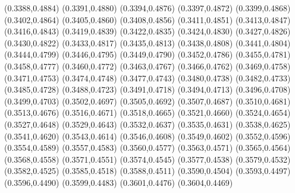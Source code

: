 \PST@Filltriangle(0.3388,0.4884)
\PST@Filltriangle(0.3391,0.4880)
\PST@Filltriangle(0.3394,0.4876)
\PST@Filltriangle(0.3397,0.4872)
\PST@Filltriangle(0.3399,0.4868)
\PST@Filltriangle(0.3402,0.4864)
\PST@Filltriangle(0.3405,0.4860)
\PST@Filltriangle(0.3408,0.4856)
\PST@Filltriangle(0.3411,0.4851)
\PST@Filltriangle(0.3413,0.4847)
\PST@Filltriangle(0.3416,0.4843)
\PST@Filltriangle(0.3419,0.4839)
\PST@Filltriangle(0.3422,0.4835)
\PST@Filltriangle(0.3424,0.4830)
\PST@Filltriangle(0.3427,0.4826)
\PST@Filltriangle(0.3430,0.4822)
\PST@Filltriangle(0.3433,0.4817)
\PST@Filltriangle(0.3435,0.4813)
\PST@Filltriangle(0.3438,0.4808)
\PST@Filltriangle(0.3441,0.4804)
\PST@Filltriangle(0.3444,0.4799)
\PST@Filltriangle(0.3446,0.4795)
\PST@Filltriangle(0.3449,0.4790)
\PST@Filltriangle(0.3452,0.4786)
\PST@Filltriangle(0.3455,0.4781)
\PST@Filltriangle(0.3458,0.4777)
\PST@Filltriangle(0.3460,0.4772)
\PST@Filltriangle(0.3463,0.4767)
\PST@Filltriangle(0.3466,0.4762)
\PST@Filltriangle(0.3469,0.4758)
\PST@Filltriangle(0.3471,0.4753)
\PST@Filltriangle(0.3474,0.4748)
\PST@Filltriangle(0.3477,0.4743)
\PST@Filltriangle(0.3480,0.4738)
\PST@Filltriangle(0.3482,0.4733)
\PST@Filltriangle(0.3485,0.4728)
\PST@Filltriangle(0.3488,0.4723)
\PST@Filltriangle(0.3491,0.4718)
\PST@Filltriangle(0.3494,0.4713)
\PST@Filltriangle(0.3496,0.4708)
\PST@Filltriangle(0.3499,0.4703)
\PST@Filltriangle(0.3502,0.4697)
\PST@Filltriangle(0.3505,0.4692)
\PST@Filltriangle(0.3507,0.4687)
\PST@Filltriangle(0.3510,0.4681)
\PST@Filltriangle(0.3513,0.4676)
\PST@Filltriangle(0.3516,0.4671)
\PST@Filltriangle(0.3518,0.4665)
\PST@Filltriangle(0.3521,0.4660)
\PST@Filltriangle(0.3524,0.4654)
\PST@Filltriangle(0.3527,0.4648)
\PST@Filltriangle(0.3529,0.4643)
\PST@Filltriangle(0.3532,0.4637)
\PST@Filltriangle(0.3535,0.4631)
\PST@Filltriangle(0.3538,0.4625)
\PST@Filltriangle(0.3541,0.4620)
\PST@Filltriangle(0.3543,0.4614)
\PST@Filltriangle(0.3546,0.4608)
\PST@Filltriangle(0.3549,0.4602)
\PST@Filltriangle(0.3552,0.4596)
\PST@Filltriangle(0.3554,0.4589)
\PST@Filltriangle(0.3557,0.4583)
\PST@Filltriangle(0.3560,0.4577)
\PST@Filltriangle(0.3563,0.4571)
\PST@Filltriangle(0.3565,0.4564)
\PST@Filltriangle(0.3568,0.4558)
\PST@Filltriangle(0.3571,0.4551)
\PST@Filltriangle(0.3574,0.4545)
\PST@Filltriangle(0.3577,0.4538)
\PST@Filltriangle(0.3579,0.4532)
\PST@Filltriangle(0.3582,0.4525)
\PST@Filltriangle(0.3585,0.4518)
\PST@Filltriangle(0.3588,0.4511)
\PST@Filltriangle(0.3590,0.4504)
\PST@Filltriangle(0.3593,0.4497)
\PST@Filltriangle(0.3596,0.4490)
\PST@Filltriangle(0.3599,0.4483)
\PST@Filltriangle(0.3601,0.4476)
\PST@Filltriangle(0.3604,0.4469)
